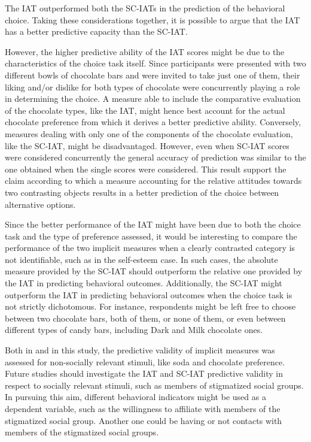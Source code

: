 \documentclass[12pt]{book}
\begin{document}
The IAT outperformed both the SC-IATs in the prediction of the behavioral choice. 
Taking these considerations together, it is possible to argue that the IAT has a better predictive capacity than the SC-IAT. 

However, the higher predictive ability of the IAT scores might be due to the characteristics of the choice task itself. 
Since participants were presented with two different bowls of chocolate bars and were invited to take just one of them, their liking and/or dislike for both types of chocolate were concurrently playing a role in determining the choice. A measure able to include the comparative evaluation of the chocolate types, like the IAT, might hence best account for the actual chocolate preference from which it derives a better predictive ability. 
Conversely,  measures dealing with only one of the components of the chocolate evaluation, like the SC-IAT, might be disadvantaged. 
However, even when SC-IAT scores were considered concurrently the general accuracy of prediction was similar to the one obtained when the single scores were considered. 
This result support the claim according to which a measure accounting for the relative attitudes towards two contrasting objects results in a better prediction of the choice between alternative options.

 Since the better performance of the IAT might have been due to both the choice task and the type of preference assessed, it would be interesting to compare the performance of the two implicit measures when a clearly contrasted category is not identifiable, such as in the self-esteem case.
 In such cases, the absolute measure provided by the SC-IAT should outperform the relative one provided by the IAT in predicting behavioral outcomes.
 Additionally, the SC-IAT might outperform the IAT in predicting behavioral outcomes when the choice task is not strictly dichotomous. 
 For instance, respondents might be left free to choose between two chocolate bars, both of them, or none of them, or even between different types of candy bars, including Dark and Milk chocolate ones.

Both in  and in this study, the predictive validity of implicit measures was assessed for non-socially relevant stimuli, like soda and chocolate preference. Future studies should investigate the IAT and SC-IAT predictive validity in respect to socially relevant stimuli, such as members of stigmatized social groups. 
In pursuing this aim, different behavioral indicators might be used as a dependent variable, such as the willingness to affiliate with members of the stigmatized social group. Another one could be having or not contacts with members of the stigmatized social groups.
\end{document}
